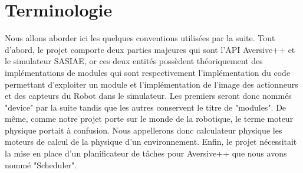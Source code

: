\section{Terminologie}
Nous allons aborder ici les quelques conventions utilisées par la suite. Tout d'abord, le projet comporte deux parties majeures qui sont l'API Aversive++ et le simulateur SASIAE, or ces deux entités possèdent théoriquement des implémentations de modules qui sont respectivement l'implémentation du code permettant d'exploiter un module et l'implémentation de l'image des actionneurs et des capteurs du Robot dans le simulateur. Les premiers seront donc nommés "device" par la suite tandis que les autres conservent le titre de "modules". De même, comme notre projet porte sur le monde de la robotique, le terme moteur physique portait à confusion. Nous appellerons donc calculateur physique les moteurs de calcul de la physique d'un environnement. Enfin, le projet nécessitait la mise en place d'un planificateur de tâches pour Aversive++ que nous avons nommé "Scheduler".




